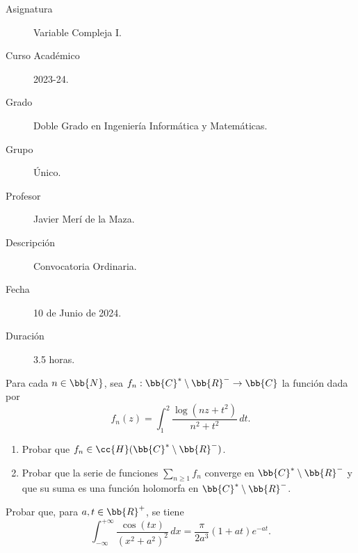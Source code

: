 \documentclass[12pt]{article}
\begin{document}

    
    

    \begin{description}
        \item[Asignatura] Variable Compleja I.
        \item[Curso Académico] 2023-24.
        \item[Grado] Doble Grado en Ingeniería Informática y Matemáticas.
        \item[Grupo] Único.
        \item[Profesor] Javier Merí de la Maza.
        \item[Descripción] Convocatoria Ordinaria.
        \item[Fecha] 10 de Junio de 2024.
        \item[Duración] 3.5 horas.
    \end{description}
    \newpage

    \begin{ejercicio}[2.5 puntos]
        Para cada $n\in \bb{N}$, sea $f_n : \bb{C}^* \setminus \bb{R}^- \to \bb{C}$ la función dada por
        \[
            f_n(z) = \int_1^2 \frac{\log(nz + t^2)}{n^2 + t^2} \, dt.
        \]
        \begin{enumerate}
            \item Probar que $f_n \in \cc{H}(\bb{C}^* \setminus \bb{R}^-)$.

            \item Probar que la serie de funciones $\sum\limits_{n\geq 1} f_n$ converge en $\bb{C}^* \setminus \bb{R}^-$ y que su suma es una función holomorfa en $\bb{C}^* \setminus \bb{R}^-$.
        \end{enumerate}
    \end{ejercicio}

    \begin{ejercicio}[2.5 puntos]
        Probar que, para $a, t \in \bb{R}^+$, se tiene
        \[
            \int_{-\infty}^{+\infty} \frac{\cos(tx)}{(x^2 + a^2)^2} \, dx = \frac{\pi}{2a^3} (1 + at) e^{-at}.
        \]
    \end{ejercicio}
\end{document}
